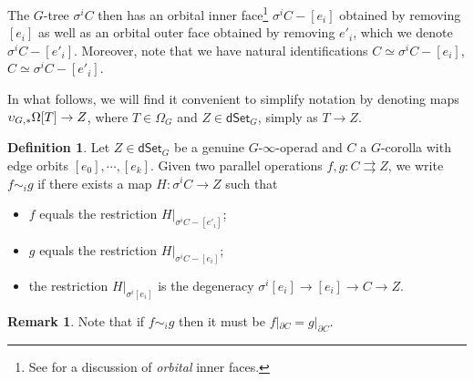 \documentclass[a4paper,10pt]{article}%
\numberwithin{equation}{section}
\numberwithin{figure}{section}
\theoremstyle{definition} %
\newtheorem{definition}[equation]{Definition}%
\newtheorem{remark}[equation]{Remark}%
\newcommand{\1}{\ensuremath{\mathbbm 1}}%
\begin{document}
The $G$-tree $\sigma^i C$ then has an orbital inner face\footnote{See \cite[Defn. 2.16]{BP_edss} for a discussion of \textit{orbital} inner faces.}
$\sigma^i C - [e_i]$ obtained by removing $[e_i]$
as well as an orbital outer face obtained by removing $e'_i$,
which we denote $\sigma^i C - [e'_i]$.
Moreover, note that we have natural identifications
$C \simeq \sigma^i C - [e_i]$,
$C \simeq \sigma^i C - [e'_i]$.



In what follows, we will find it convenient to simplify notation by denoting maps $\upsilon_{G,\**}\Omega[T] \to Z$,
where $T \in \Omega_G$ and $Z \in \mathsf{dSet}_G$,
simply as $T \to Z$.


\begin{definition}\label{HOEQUIVS DEF}
	Let $Z \in \mathsf{dSet}_G$ be a genuine $G$-$\infty$-operad and $C$ a $G$-corolla with edge orbits
	$[e_0],\cdots,[e_k]$.
%	
	Given two parallel operations 
	$f,g\colon C \rightrightarrows Z$,
	we write $f \sim_i g$ if there exists a map
	$H \colon \sigma^i C \to Z$ such that
\begin{itemize}
\item $f$ equals the restriction $H|_{\sigma^i C-[e'_i]}$;
\item $g$ equals the restriction $H|_{\sigma^i C-[e_i]}$;
\item the restriction $H|_{\sigma^i [e_i]}$
is the degeneracy $\sigma^i [e_i] \to [e_i] \to C \to Z$.
\end{itemize}
\end{definition}


\begin{remark}\label{HOMOTBOUND REM}
	Note that if $f \sim_i g$ then it must be
	$f|_{\partial C} = g|_{\partial C}$.
\end{remark}
\end{document}
